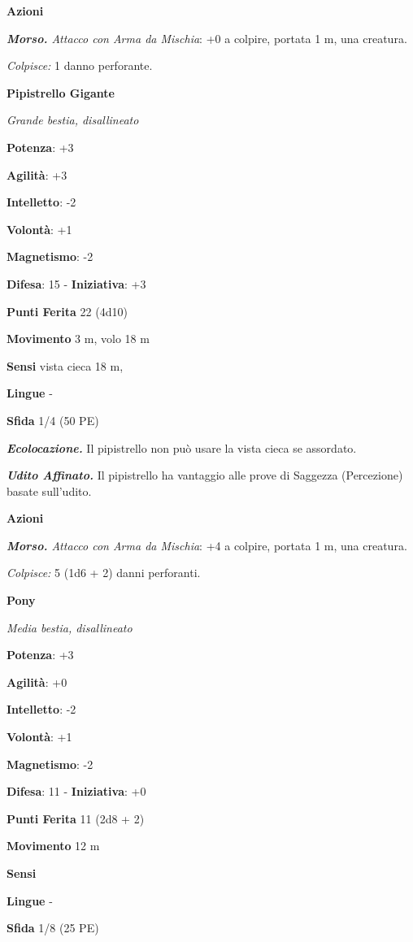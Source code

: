 \begin{multicols}{2}
\smallskip\textbf{Azioni}

\emph{\textbf{Morso.} Attacco con Arma da Mischia}: +0 a colpire,
portata 1 m, una creatura.

\emph{Colpisce:} 1 danno perforante.

\textbf{Pipistrello Gigante}

\emph{Grande bestia, disallineato}

\textbf{Potenza}: +3

\textbf{Agilità}: +3

\textbf{Intelletto}: -2

\textbf{Volontà}: +1

\textbf{Magnetismo}: -2

\textbf{Difesa}: 15 - \textbf{Iniziativa}: +3

\textbf{Punti Ferita} 22 (4d10)

\textbf{Movimento} 3 m, volo 18 m

\textbf{Sensi} vista cieca 18 m, 

\textbf{Lingue} -

\textbf{Sfida} 1/4 (50 PE)\smallskip

\emph{\textbf{Ecolocazione.}} Il pipistrello non può usare la vista
cieca se assordato.

\emph{\textbf{Udito Affinato.}} Il pipistrello ha vantaggio alle prove
di Saggezza (Percezione) basate sull'udito.

\smallskip\textbf{Azioni}

\emph{\textbf{Morso.} Attacco con Arma da Mischia}: +4 a colpire,
portata 1 m, una creatura.

\emph{Colpisce:} 5 (1d6 + 2) danni perforanti.

\textbf{Pony}

\emph{Media bestia, disallineato}

\textbf{Potenza}: +3

\textbf{Agilità}: +0

\textbf{Intelletto}: -2

\textbf{Volontà}: +1

\textbf{Magnetismo}: -2

\textbf{Difesa}: 11 - \textbf{Iniziativa}: +0

\textbf{Punti Ferita} 11 (2d8 + 2)

\textbf{Movimento} 12 m

\textbf{Sensi} 

\textbf{Lingue} -

\textbf{Sfida} 1/8 (25 PE)\smallskip


\end{multicols}
